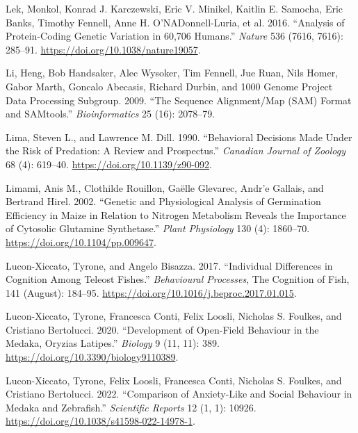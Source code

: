 \documentclass[
]{book}
\newlength{\cslhangindent}
\newlength{\cslentryspacingunit} %
\newenvironment{CSLReferences}[2] %
 {%
  \setlength{\parindent}{0pt}
  \ifodd #1
  \let\oldpar\par
  \def\par{\hangindent=\cslhangindent\oldpar}
  \fi
  \setlength{\parskip}{#2\cslentryspacingunit}
 }%
 {}
\begin{document}
\begin{CSLReferences}{1}{0}
\leavevmode{}%
Lek, Monkol, Konrad J. Karczewski, Eric V. Minikel, Kaitlin E. Samocha, Eric Banks, Timothy Fennell, Anne H. O'NADonnell-Luria, et al. 2016. {``Analysis of Protein-Coding Genetic Variation in 60,706 Humans.''} \emph{Nature} 536 (7616, 7616): 285--91. \url{https://doi.org/10.1038/nature19057}.

\leavevmode{}%
Li, Heng, Bob Handsaker, Alec Wysoker, Tim Fennell, Jue Ruan, Nils Homer, Gabor Marth, Goncalo Abecasis, Richard Durbin, and 1000 Genome Project Data Processing Subgroup. 2009. {``The {Sequence} Alignment/Map ({SAM}) Format and {SAMtools}.''} \emph{Bioinformatics} 25 (16): 2078--79.

\leavevmode{}%
Lima, Steven L., and Lawrence M. Dill. 1990. {``Behavioral Decisions Made Under the Risk of Predation: A Review and Prospectus.''} \emph{Canadian Journal of Zoology} 68 (4): 619--40. \url{https://doi.org/10.1139/z90-092}.

\leavevmode{}%
Limami, Anis M., Clothilde Rouillon, Gaëlle Glevarec, Andr'e Gallais, and Bertrand Hirel. 2002. {``Genetic and {Physiological Analysis} of {Germination Efficiency} in {Maize} in {Relation} to {Nitrogen Metabolism Reveals} the {Importance} of {Cytosolic Glutamine Synthetase}.''} \emph{Plant Physiology} 130 (4): 1860--70. \url{https://doi.org/10.1104/pp.009647}.

\leavevmode{}%
Lucon-Xiccato, Tyrone, and Angelo Bisazza. 2017. {``Individual Differences in Cognition Among Teleost Fishes.''} \emph{Behavioural Processes}, The {Cognition} of {Fish}, 141 (August): 184--95. \url{https://doi.org/10.1016/j.beproc.2017.01.015}.

\leavevmode{}%
Lucon-Xiccato, Tyrone, Francesca Conti, Felix Loosli, Nicholas S. Foulkes, and Cristiano Bertolucci. 2020. {``Development of {Open-Field Behaviour} in the {Medaka}, {Oryzias} Latipes.''} \emph{Biology} 9 (11, 11): 389. \url{https://doi.org/10.3390/biology9110389}.

\leavevmode{}%
Lucon-Xiccato, Tyrone, Felix Loosli, Francesca Conti, Nicholas S. Foulkes, and Cristiano Bertolucci. 2022. {``Comparison of Anxiety-Like and Social Behaviour in Medaka and Zebrafish.''} \emph{Scientific Reports} 12 (1, 1): 10926. \url{https://doi.org/10.1038/s41598-022-14978-1}.


\end{CSLReferences}
\end{document}

